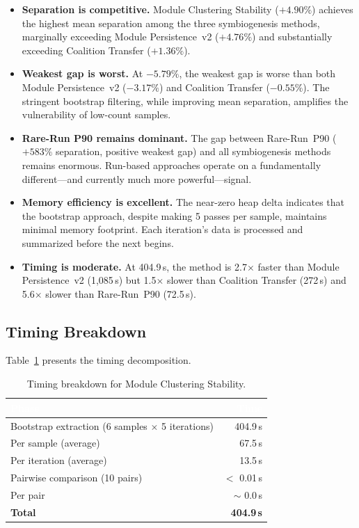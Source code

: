 \documentclass{../yalumba}
\begin{document}
\begin{itemize}
  \item \textbf{Separation is competitive.}  Module Clustering Stability
    ($+4.90\%$) achieves the highest mean separation among the three
    symbiogenesis methods, marginally exceeding Module Persistence~v2
    ($+4.76\%$) and substantially exceeding Coalition Transfer ($+1.36\%$).
  \item \textbf{Weakest gap is worst.}  At $-5.79\%$, the weakest gap is
    worse than both Module Persistence~v2 ($-3.17\%$) and Coalition Transfer
    ($-0.55\%$).  The stringent bootstrap filtering, while improving mean
    separation, amplifies the vulnerability of low-count samples.
  \item \textbf{Rare-Run P90 remains dominant.}  The gap between Rare-Run~P90
    ($+583\%$ separation, positive weakest gap) and all symbiogenesis methods
    remains enormous.  Run-based approaches operate on a fundamentally
    different---and currently much more powerful---signal.
  \item \textbf{Memory efficiency is excellent.}  The near-zero heap delta
    indicates that the bootstrap approach, despite making 5 passes per sample,
    maintains minimal memory footprint.  Each iteration's data is processed
    and summarized before the next begins.
  \item \textbf{Timing is moderate.}  At 404.9\,s, the method is 2.7$\times$
    faster than Module Persistence~v2 (1{,}085\,s) but 1.5$\times$ slower
    than Coalition Transfer (272\,s) and 5.6$\times$ slower than Rare-Run~P90
    (72.5\,s).
\end{itemize}

\subsection{Timing Breakdown}

Table~\ref{tab:timing} presents the timing decomposition.

\begin{table}[H]
  \centering
  \tablestyle
  \caption{Timing breakdown for Module Clustering Stability.}
  \label{tab:timing}
  \begin{tabular}{lr}
    \toprule
    \rowcolor{table-header}
    \textcolor{white}{\textbf{Phase}} &
    \textcolor{white}{\textbf{Time}} \\
    \midrule
    Bootstrap extraction (6 samples $\times$ 5 iterations) & 404.9\,s \\
    \quad Per sample (average) & 67.5\,s \\
    \quad Per iteration (average) & 13.5\,s \\
    Pairwise comparison (10 pairs) & $<$ 0.01\,s \\
    \quad Per pair & $\sim$ 0.0\,s \\
    \midrule
    \textbf{Total} & \textbf{404.9\,s} \\
    \bottomrule
  \end{tabular}
\end{table}
\end{document}
